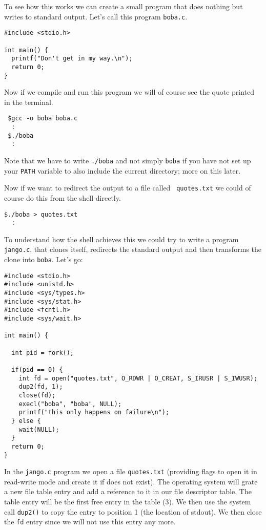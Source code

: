 \documentclass[a4paper,11pt]{article}
\begin{document}
To see how this works we can create a small program that does nothing
but writes to standard output. Let's call this program {\tt boba.c}.

\begin{lstlisting}
#include <stdio.h>

int main() {
  printf("Don't get in my way.\n");
  return 0;
}
\end{lstlisting}

Now if we compile and run this program we will of course see the quote
printed in the terminal.

\begin{verbatim}
 $gcc -o boba boba.c
  :
 $./boba
  :
\end{verbatim}

Note that we have to write {\tt ./boba} and not simply {\tt boba} if
you have not set up your {\tt PATH} variable to also include the
current directory; more on this later. 

Now if we want to redirect the output to a file called {\tt
  quotes.txt} we could of course do this from the shell directly.

\begin{verbatim}
$./boba > quotes.txt
  :
\end{verbatim}

To understand how the shell achieves this we could try to write a
program {\tt jango.c}, that clones itself, redirects the standard
output and then transforms the clone into {\tt boba}. Let's go:

\begin{lstlisting}
#include <stdio.h>
#include <unistd.h>
#include <sys/types.h>
#include <sys/stat.h>
#include <fcntl.h>
#include <sys/wait.h>

int main() {

  int pid = fork();

  if(pid == 0) {
    int fd = open("quotes.txt", O_RDWR | O_CREAT, S_IRUSR | S_IWUSR);
    dup2(fd, 1);
    close(fd);
    execl("boba", "boba", NULL);
    printf("this only happens on failure\n");
  } else {
    wait(NULL);
  }
  return 0;
}
\end{lstlisting}


In the {\tt jango.c} program we open a file {\tt quotes.txt}
(providing flags to open it in read-write mode and create it if does
not exist). The operating system will grate a new file table entry and
add a reference to it in our file descriptor table. The table entry
will be the first free entry in the table (3). We then use the system
call {\tt dup2()} to copy the entry to position 1 (the location of
stdout). We then close the {\tt fd} entry since we will not use this
entry any more.
\end{document}
